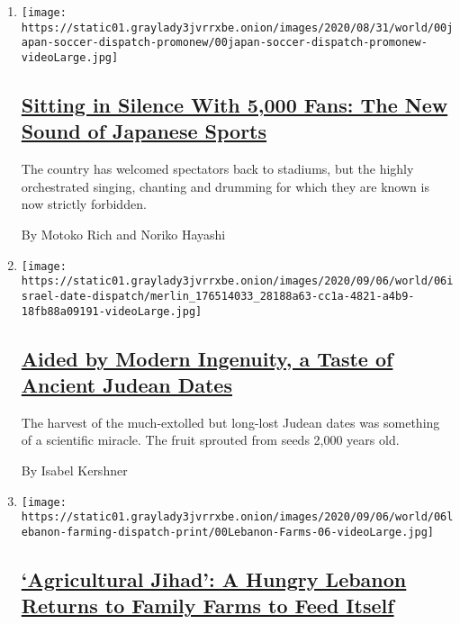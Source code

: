 \begin{enumerate}
\def\labelenumi{\arabic{enumi}.}
\item
  \texttt{[image: https://static01.graylady3jvrrxbe.onion/images/2020/08/31/world/00japan-soccer-dispatch-promonew/00japan-soccer-dispatch-promonew-videoLarge.jpg]}

  \hypertarget{sitting-in-silence-with-5000-fans-the-new-sound-of-japanese-sports}{%
  \subsection{\texorpdfstring{\href{/2020/09/09/world/asia/japan-coronavirus-jleague-soccer.html}{Sitting
  in Silence With 5,000 Fans: The New Sound of Japanese
  Sports}}{Sitting in Silence With 5,000 Fans: The New Sound of Japanese Sports}}\label{sitting-in-silence-with-5000-fans-the-new-sound-of-japanese-sports}}

  The country has welcomed spectators back to stadiums, but the highly
  orchestrated singing, chanting and drumming for which they are known
  is now strictly forbidden.

  By Motoko Rich and Noriko Hayashi
\item
  \texttt{[image: https://static01.graylady3jvrrxbe.onion/images/2020/09/06/world/06israel-date-dispatch/merlin\_176514033\_28188a63-cc1a-4821-a4b9-18fb88a09191-videoLarge.jpg]}

  \hypertarget{aided-by-modern-ingenuity-a-taste-of-ancient-judean-dates}{%
  \subsection{\texorpdfstring{\href{/2020/09/07/world/middleeast/israel-judean-dates-agriculture.html}{Aided
  by Modern Ingenuity, a Taste of Ancient Judean
  Dates}}{Aided by Modern Ingenuity, a Taste of Ancient Judean Dates}}\label{aided-by-modern-ingenuity-a-taste-of-ancient-judean-dates}}

  The harvest of the much-extolled but long-lost Judean dates was
  something of a scientific miracle. The fruit sprouted from seeds 2,000
  years old.

  By Isabel Kershner
\item
  \texttt{[image: https://static01.graylady3jvrrxbe.onion/images/2020/09/06/world/06lebanon-farming-dispatch-print/00Lebanon-Farms-06-videoLarge.jpg]}

  \hypertarget{agricultural-jihad-a-hungry-lebanon-returns-to-family-farms-to-feed-itself}{%
  \subsection{\texorpdfstring{\href{/2020/09/05/world/middleeast/lebanon-economic-crisis-farming.html}{`Agricultural
  Jihad': A Hungry Lebanon Returns to Family Farms to Feed
  Itself}}{`Agricultural Jihad': A Hungry Lebanon Returns to Family Farms to Feed Itself}}\label{agricultural-jihad-a-hungry-lebanon-returns-to-family-farms-to-feed-itself}}


\end{enumerate}
